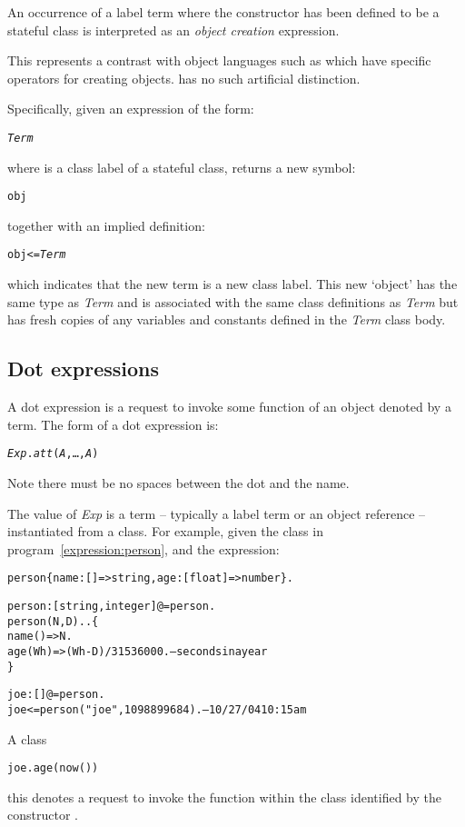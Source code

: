 An occurrence of a label term where the constructor has been defined to be a stateful class is interpreted as an \emph{object creation} expression.

\begin{aside}
This represents a contrast with object languages such as  which have specific operators for creating objects. \go has no such artificial distinction.
\end{aside}

Specifically, given an expression of the form:
\begin{alltt}
\emph{Term}
\end{alltt}
where  is a class label of a stateful class, returns a new symbol:
\begin{alltt}
obj
\end{alltt}
together with an implied definition:
\begin{alltt}
obj <= \emph{Term}
\end{alltt}
which indicates that the new term is a new class label. This new `object' has the same type as \emph{Term} and is associated with the same class definitions as \emph{Term} but has fresh copies of any variables and constants defined in the \emph{Term} class body.

\subsection{Dot expressions}
\label{expression:dot}

A dot expression is a request to invoke some function of an object denoted by a term. The form of a dot expression is:
\begin{alltt}
\emph{Exp}.\emph{att}(\emph{A},\ldots,\emph{A\subn})
\end{alltt}
Note there must be no spaces between the dot and the  name.

The value of \emph{Exp} is a term -- typically a label term or an object reference -- instantiated from a \go class. For example, given the  class in program~\vref{expression:person}, and the expression:
\begin{program}
\begin{boxed}
\begin{alltt}
person \impl \{ name:[]=>string, age:[float]=>number \}.

person:[string,integer]@=person.
person(N,D)..\{
  name() => N.
  age(Wh) => (Wh-D)/31536000.  -- seconds in a year
\}

joe:[]@=person.
joe<=person("joe",1098899684). -- 10/27/04 10:15am
\end{alltt}
\end{boxed}
\caption{\label{expression:person}A  class}
\end{program}
\begin{alltt}
joe.age(now())
\end{alltt}
this denotes a request to invoke the  function within the class identified by the constructor .

